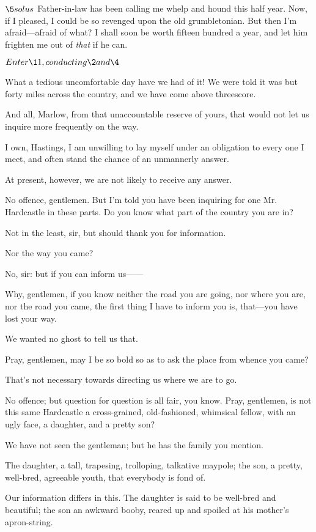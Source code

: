 \documentclass{book}
\begin{document}
    \(\5 solus\)
\5    Father-in-law has been calling me whelp and hound this
half year.  Now, if I pleased, I could be so revenged upon the old
grumbletonian.  But then I'm afraid---afraid of what?  I shall soon be
worth fifteen hundred a year, and let him frighten me out of \textit{that}
if he can.


\(Enter \11, conducting \2 and \4\)


\2  What a tedious uncomfortable day have we had of it!  We were
told it was but forty miles across the country, and we have come above
threescore.

\4  And all, Marlow, from that unaccountable reserve of yours,
that would not let us inquire more frequently on the way.

\2  I own, Hastings, I am unwilling to lay myself under an
obligation to every one I meet, and often stand the chance of an
unmannerly answer.

\4  At present, however, we are not likely to receive any
answer.

\5  No offence, gentlemen.  But I'm told you have been inquiring for
one Mr. Hardcastle in these parts.  Do you know what part of the
country you are in?

\4  Not in the least, sir, but should thank you for
information.

\5  Nor the way you came?

\4  No, sir: but if you can inform us------

\5  Why, gentlemen, if you know neither the road you are going, nor
where you are, nor the road you came, the first thing I have to inform
you is, that---you have lost your way.

\2  We wanted no ghost to tell us that.

\5  Pray, gentlemen, may I be so bold so as to ask the place from
whence you came?

\2  That's not necessary towards directing us where we are to go.

\5  No offence; but question for question is all fair, you know. 
Pray, gentlemen, is not this same Hardcastle a cross-grained,
old-fashioned, whimsical fellow, with an ugly face, a daughter, and a
pretty son?

\4  We have not seen the gentleman; but he has the family you
mention.

\5  The daughter, a tall, trapesing, trolloping, talkative maypole;
the son, a pretty, well-bred, agreeable youth, that everybody is fond
of.

\2  Our information differs in this.  The daughter is said to be
well-bred and beautiful; the son an awkward booby, reared up and
spoiled at his mother's apron-string.
\end{document}
